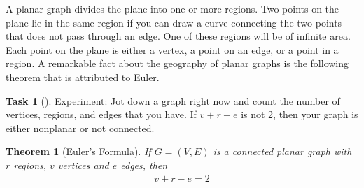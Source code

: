 \documentclass[10pt,]{book}
\theoremstyle{plain}
\newtheorem{theorem}{Theorem}[section]
\theoremstyle{definition}
\theoremstyle{definition}
\theoremstyle{definition}
\theoremstyle{definition}
\newtheorem{task}[project]{Task}
\theoremstyle{definition}
\numberwithin{equation}{section}
\begin{document}
\par
A planar graph divides the plane into one or more regions. Two points on the plane lie in the same region if you can draw a curve connecting the
two points that does not pass through an edge. One of these regions will be of infinite area. Each point on the plane is either a vertex, a point on an edge, or a point in a region. A remarkable fact about the geography of planar graphs is the following theorem that is attributed to Euler.%
\begin{task}[]\label{task-1}
Experiment: Jot down a graph right now and count the number of vertices, regions, and edges that you have. If \(v + r - e\) is not 2, then your graph
is either nonplanar or not connected.%
\end{task}
\begin{theorem}[Euler's Formula]\label{theorem-euler-formula}
If \(G = (V, E)\) is a connected planar graph with \(r\) regions, \(v\) vertices and \(e\) edges, then
\begin{gather}
v + r - e = 2\label{euler-formula}
\end{gather}%
\end{theorem}
\end{document}
